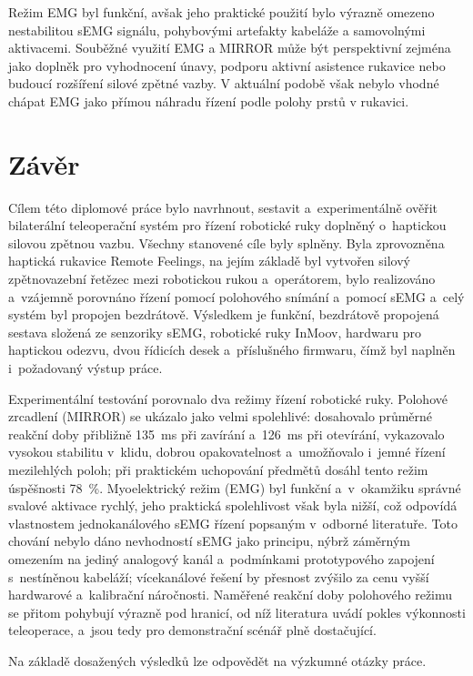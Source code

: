 \documentclass[FZS,DP]{tulthesis}
\begin{document}
Režim EMG byl funkční, avšak jeho praktické použití bylo výrazně omezeno nestabilitou sEMG signálu, pohybovými artefakty kabeláže a samovolnými aktivacemi. Souběžné využití EMG a MIRROR může být perspektivní zejména jako doplněk pro vyhodnocení únavy, podporu aktivní asistence rukavice nebo budoucí rozšíření silové zpětné vazby. V aktuální podobě však nebylo vhodné chápat EMG jako přímou náhradu řízení podle polohy prstů v rukavici.
\chapter{Závěr}
Cílem této diplomové práce bylo navrhnout, sestavit a~experimentálně ověřit bilaterální teleoperační systém pro řízení robotické ruky doplněný o~haptickou silovou zpětnou vazbu. Všechny stanovené cíle byly splněny. Byla zprovozněna haptická rukavice Remote Feelings, na jejím základě byl vytvořen silový zpětnovazební řetězec mezi robotickou rukou a~operátorem, bylo realizováno a~vzájemně porovnáno řízení pomocí polohového snímání a~pomocí sEMG a~celý systém byl propojen bezdrátově. Výsledkem je funkční, bezdrátově propojená
sestava složená ze senzoriky sEMG, robotické ruky InMoov, hardwaru pro
haptickou odezvu, dvou řídicích desek a~příslušného firmwaru, čímž byl naplněn i~požadovaný výstup práce.

Experimentální testování porovnalo dva režimy řízení robotické ruky. Polohové zrcadlení (MIRROR) se ukázalo jako velmi spolehlivé: dosahovalo průměrné reakční doby přibližně 135~ms při zavírání a~126~ms při otevírání, vykazovalo vysokou stabilitu v~klidu, dobrou opakovatelnost a~umožňovalo i~jemné řízení mezilehlých poloh; při praktickém uchopování předmětů dosáhl tento režim úspěšnosti 78~\%. Myoelektrický režim (EMG) byl funkční a~v~okamžiku správné svalové aktivace rychlý, jeho praktická spolehlivost však byla nižší, což
odpovídá vlastnostem jednokanálového sEMG řízení popsaným v~odborné literatuře. Toto chování nebylo dáno nevhodností sEMG jako principu, nýbrž záměrným omezením na jediný analogový kanál a~podmínkami prototypového zapojení s~nestíněnou kabeláží; vícekanálové řešení by přesnost zvýšilo za cenu vyšší hardwarové a~kalibrační náročnosti. Naměřené reakční doby polohového režimu se přitom pohybují výrazně pod hranicí, od níž literatura uvádí pokles výkonnosti teleoperace, a~jsou tedy pro demonstrační scénář plně dostačující.

Na základě dosažených výsledků lze odpovědět na výzkumné otázky práce.
\end{document}
